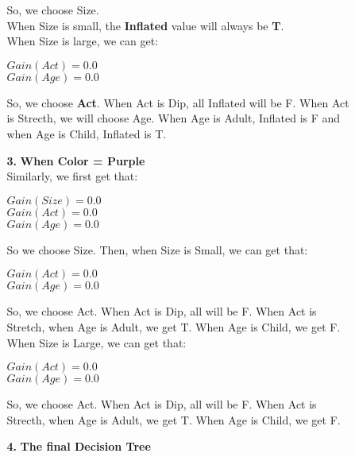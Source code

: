 \begin{enumerate}
\begin{enumerate}
\begin{enumerate}
So, we choose Size.\\

When Size is small, the {\bf Inflated} value will always be {\bf T}.\\

When Size is large, we can get:\\
\begin{center}
$ Gain(Act) = 0.0 $ \\
$ Gain(Age) = 0.0 $ \\
\end{center}

So, we choose {\bf Act}. When Act is Dip, all Inflated will be F. When Act is Strecth, we will choose Age. When Age is Adult, Inflated is F and when Age is Child, Inflated is T.

\item[{\bf 3.}] {\bf When Color = Purple}\\

Similarly, we first get that:\\
\begin{center}
$ Gain(Size) = 0.0 $ \\
$ Gain(Act) = 0.0 $ \\
$ Gain(Age) = 0.0 $ \\
\end{center}

So we choose Size. Then, when Size is Small, we can get that:\\
\begin{center}
$ Gain(Act) = 0.0 $ \\
$ Gain(Age) = 0.0 $ \\
\end{center}

So, we choose Act. When Act is Dip, all will be F. When Act is Stretch, when Age is Adult, we get T. When Age is Child, we get F.\\

When Size is Large, we can get that:\\
\begin{center}
$ Gain(Act) = 0.0 $ \\
$ Gain(Age) = 0.0 $ \\
\end{center}

So, we choose Act. When Act is Dip, all will be F. When Act is Strecth, when Age is Adult, we get T. When Age is Child, we get F.\\

\item[{\bf 4.}] {\bf The final Decision Tree}\\


\end{enumerate}
\end{enumerate}
\end{enumerate}
